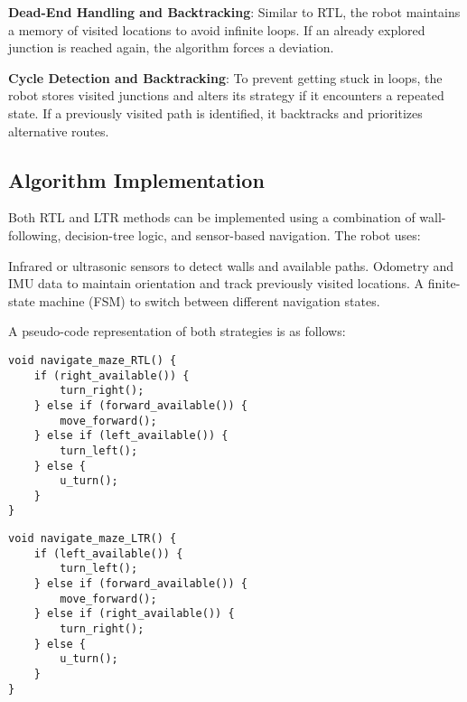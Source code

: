 \textbf{Dead-End Handling and Backtracking}:
Similar to RTL, the robot maintains a memory of visited locations to avoid infinite loops.
If an already explored junction is reached again, the algorithm forces a deviation.

\textbf{Cycle Detection and Backtracking}:
To prevent getting stuck in loops, the robot stores visited junctions and alters its strategy if it encounters a repeated state.
If a previously visited path is identified, it backtracks and prioritizes alternative routes.

\subsection{Algorithm Implementation}
Both RTL and LTR methods can be implemented using a combination of wall-following, decision-tree logic, and sensor-based navigation. The robot uses:

Infrared or ultrasonic sensors to detect walls and available paths.
Odometry and IMU data to maintain orientation and track previously visited locations.
A finite-state machine (FSM) to switch between different navigation states.

A pseudo-code representation of both strategies is as follows:
\begin{lstlisting}[style=cppstyle2]
void navigate_maze_RTL() {
	if (right_available()) {
		turn_right();
	} else if (forward_available()) {
		move_forward();
	} else if (left_available()) {
		turn_left();
	} else {
		u_turn();
	}
}
\end{lstlisting}

\begin{lstlisting}[style=cppstyle2]
void navigate_maze_LTR() {
	if (left_available()) {
		turn_left();
	} else if (forward_available()) {
		move_forward();
	} else if (right_available()) {
		turn_right();
	} else {
		u_turn();
	}
}
\end{lstlisting}